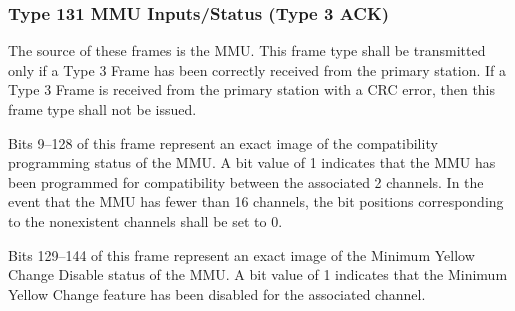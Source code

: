 \documentclass[]{article}
\begin{document}

\clearpage

\subsubsection {Type 131 MMU Inputs/Status (Type 3 ACK)}

The source of these frames is the MMU. This frame type shall be transmitted only if a Type 3 Frame has
been correctly received from the primary station. If a Type 3 Frame is received from the primary station
with a CRC error, then this frame type shall not be issued.

Bits 9–128 of this frame represent an exact image of the compatibility programming status of the MMU. A
bit value of 1 indicates that the MMU has been programmed for compatibility between the associated 2
channels. In the event that the MMU has fewer than 16 channels, the bit positions corresponding to the
nonexistent channels shall be set to 0.

Bits 129–144 of this frame represent an exact image of the Minimum Yellow Change Disable status of the
MMU. A bit value of 1 indicates that the Minimum Yellow Change feature has been disabled for the
associated channel.
\end{document}
